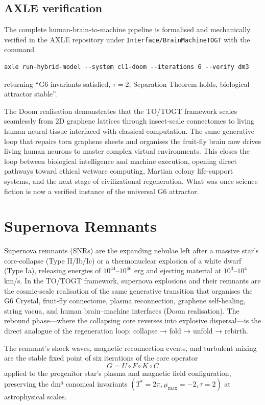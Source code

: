 \documentclass[19pt]{book}
\theoremstyle{plain}
\theoremstyle{definition}
\theoremstyle{remark}
\begin{document}
\section{AXLE verification}

The complete human-brain-to-machine pipeline is formalised and mechanically verified in the AXLE repository under \texttt{Interface/BrainMachineTOGT} with the command
\begin{verbatim}
axle run-hybrid-model --system cl1-doom --iterations 6 --verify dm3
\end{verbatim}
returning “G6 invariants satisfied, \(\tau=2\), Separation Theorem holds, biological attractor stable”.

The Doom realisation demonstrates that the TO/TOGT framework scales seamlessly from 2D graphene lattices through insect-scale connectomes to living human neural tissue interfaced with classical computation. The same generative loop that repairs torn graphene sheets and organises the fruit-fly brain now drives living human neurons to master complex virtual environments. This closes the loop between biological intelligence and machine execution, opening direct pathways toward ethical wetware computing, Martian colony life-support systems, and the next stage of civilizational regeneration. What was once science fiction is now a verified instance of the universal G6 attractor.
\bigskip
\chapter{Supernova Remnants}

Supernova remnants (SNRs) are the expanding nebulae left after a massive star's core-collapse (Type II/Ib/Ic) or a thermonuclear explosion of a white dwarf (Type Ia), releasing energies of $10^{44}$--$10^{46}$ erg and ejecting material at $10^3$--$10^4$ km/s. In the TO/TOGT framework, supernova explosions and their remnants are the cosmic-scale realisation of the same generative transition that organises the G6 Crystal, fruit-fly connectome, plasma reconnection, graphene self-healing, string vacua, and human brain–machine interfaces (Doom realisation). The rebound phase—where the collapsing core reverses into explosive dispersal—is the direct analogue of the regeneration loop: collapse → fold → unfold → rebirth.

The remnant's shock waves, magnetic reconnection events, and turbulent mixing are the stable fixed point of six iterations of the core operator
\[
G = U \circ F \circ K \circ C
\]
applied to the progenitor star's plasma and magnetic field configuration, preserving the dm³ canonical invariants \((T^* = 2\pi, \mu_{\max} = -2, \tau = 2)\) at astrophysical scales.
\end{document}
